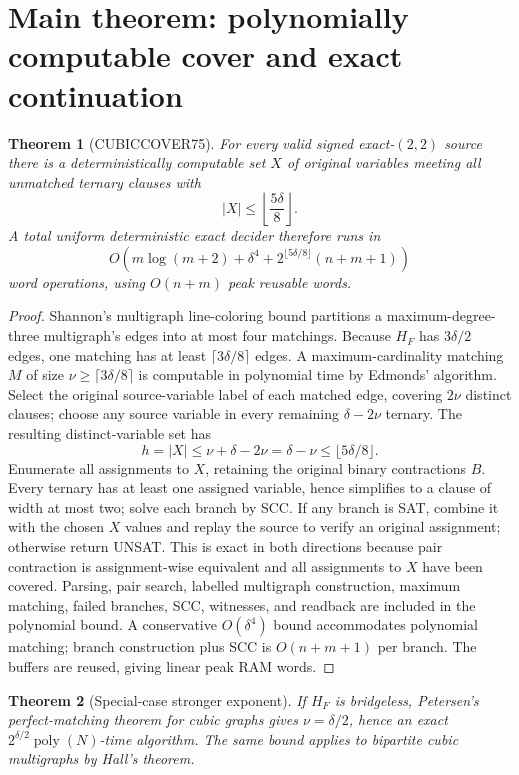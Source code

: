 \documentclass[11pt]{article}
\newtheorem{theorem}{Theorem}
\begin{document}
\section{Main theorem: polynomially computable cover and exact continuation}
\begin{theorem}[CUBICCOVER75]
For every valid signed exact-$(2,2)$ source there is a deterministically computable set $X$ of original variables meeting all unmatched ternary clauses with
\[
|X|\le \left\lfloor\frac{5\delta}{8}\right\rfloor.
\]
A total uniform deterministic exact decider therefore runs in
\[
O\!\left(m\log(m+2)+\delta^4+
 2^{\lfloor5\delta/8\rfloor}(n+m+1)\right)
\]
word operations, using $O(n+m)$ peak reusable words.
\end{theorem}
\begin{proof}
Shannon's multigraph line-coloring bound partitions a maximum-degree-three multigraph's edges into at most four matchings. Because $H_F$ has $3\delta/2$ edges, one matching has at least $\lceil3\delta/8\rceil$ edges. A maximum-cardinality matching $M$ of size $\nu\ge\lceil3\delta/8\rceil$ is computable in polynomial time by Edmonds' algorithm. Select the original source-variable label of each matched edge, covering $2\nu$ distinct clauses; choose any source variable in every remaining $\delta-2\nu$ ternary. The resulting distinct-variable set has
\[
h=|X|\le \nu+\delta-2\nu
=\delta-\nu\le\lfloor5\delta/8\rfloor.
\]
Enumerate all assignments to $X$, retaining the original binary contractions $B$. Every ternary has at least one assigned variable, hence simplifies to a clause of width at most two; solve each branch by SCC. If any branch is SAT, combine it with the chosen $X$ values and replay the source to verify an original assignment; otherwise return UNSAT. This is exact in both directions because pair contraction is assignment-wise equivalent and all assignments to $X$ have been covered. Parsing, pair search, labelled multigraph construction, maximum matching, failed branches, SCC, witnesses, and readback are included in the polynomial bound. A conservative $O(\delta^4)$ bound accommodates polynomial matching; branch construction plus SCC is $O(n+m+1)$ per branch. The buffers are reused, giving linear peak RAM words.
\end{proof}

\begin{theorem}[Special-case stronger exponent]
If $H_F$ is bridgeless, Petersen's perfect-matching theorem for cubic graphs gives $\nu=\delta/2$, hence an exact $2^{\delta/2}\operatorname{poly}(N)$-time algorithm. The same bound applies to bipartite cubic multigraphs by Hall's theorem.
\end{theorem}
\end{document}

